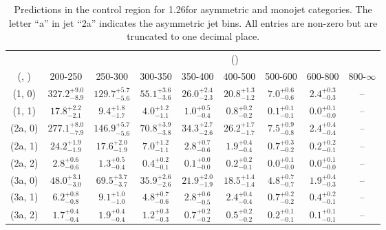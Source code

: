 \begin{table}[h!]
\tiny
\centering
\caption{Predictions in the \mmj control region for 1.26\ifb for asymmetric and monojet categories. The letter ``a'' in jet \eg ``2a''  indicates the asymmetric jet bins. All entries are non-zero but are truncated to one decimal place.\label{tab:predsep_ewk_mumu_asym}}
\begin{tabular}
{ccccccccc}
	\hline\hline
&	& \multicolumn{8}{c}{\scalht (\gev)} \\ 
	 (\njet,  \nb) & 200-250 & 250-300 & 300-350 & 350-400 & 400-500 & 500-600 & 600-800 & 800-$\infty$ \\ [0.8ex] 
\hline
	(1, 0) & $327.2^{+ 9.0 }_{- 8.9 }$ & $129.7^{+ 5.7 }_{- 5.6 }$ & $55.1^{+ 3.6 }_{- 3.6 }$ & $26.0^{+ 2.4 }_{- 2.3 }$ & $20.8^{+ 1.3 }_{- 1.2 }$ & $7.0^{+ 0.6 }_{- 0.6 }$ & $2.4^{+ 0.3 }_{- 0.3 }$ & -- \\[0.5ex] 
	(1, 1) & $17.8^{+ 2.2 }_{- 2.1 }$ & $9.4^{+ 1.8 }_{- 1.7 }$ & $4.0^{+ 1.2 }_{- 1.1 }$ & $1.0^{+ 0.5 }_{- 0.4 }$ & $0.8^{+ 0.2 }_{- 0.2 }$ & $0.1^{+ 0.1 }_{- 0.1 }$ & $0.0^{+ 0.1 }_{- 0.0 }$ & -- \\[0.5ex] 
	(2a, 0) & $277.1^{+ 8.0 }_{- 7.9 }$ & $146.9^{+ 5.7 }_{- 5.6 }$ & $70.8^{+ 3.9 }_{- 3.8 }$ & $34.3^{+ 2.7 }_{- 2.6 }$ & $26.2^{+ 1.7 }_{- 1.7 }$ & $7.5^{+ 0.9 }_{- 0.8 }$ & $2.4^{+ 0.4 }_{- 0.4 }$ & -- \\[0.5ex] 
	(2a, 1) & $24.2^{+ 1.9 }_{- 1.9 }$ & $17.6^{+ 2.0 }_{- 1.9 }$ & $7.0^{+ 1.2 }_{- 1.1 }$ & $2.8^{+ 0.7 }_{- 0.6 }$ & $1.9^{+ 0.4 }_{- 0.4 }$ & $0.7^{+ 0.3 }_{- 0.2 }$ & $0.2^{+ 0.2 }_{- 0.1 }$ & -- \\[0.5ex] 
	(2a, 2) & $2.8^{+ 0.6 }_{- 0.6 }$ & $1.3^{+ 0.5 }_{- 0.4 }$ & $0.4^{+ 0.2 }_{- 0.1 }$ & $0.1^{+ 0.0 }_{- 0.0 }$ & $0.2^{+ 0.2 }_{- 0.1 }$ & $0.0^{+ 0.1 }_{- 0.0 }$ & $0.0^{+ 0.1 }_{- 0.0 }$ & -- \\[0.5ex] 
	(3a, 0) & $48.0^{+ 3.1 }_{- 3.0 }$ & $69.5^{+ 3.7 }_{- 3.7 }$ & $35.9^{+ 2.6 }_{- 2.6 }$ & $21.9^{+ 2.0 }_{- 1.9 }$ & $18.5^{+ 1.4 }_{- 1.4 }$ & $4.8^{+ 0.7 }_{- 0.7 }$ & $1.9^{+ 0.4 }_{- 0.3 }$ & -- \\[0.5ex] 
	(3a, 1) & $6.2^{+ 0.8 }_{- 0.8 }$ & $9.1^{+ 1.0 }_{- 1.0 }$ & $4.8^{+ 0.7 }_{- 0.6 }$ & $2.8^{+ 0.6 }_{- 0.5 }$ & $2.4^{+ 0.4 }_{- 0.4 }$ & $0.7^{+ 0.2 }_{- 0.2 }$ & $0.4^{+ 0.2 }_{- 0.1 }$ & -- \\[0.5ex] 
	(3a, 2) & $1.7^{+ 0.4 }_{- 0.4 }$ & $1.9^{+ 0.4 }_{- 0.4 }$ & $1.2^{+ 0.3 }_{- 0.3 }$ & $0.7^{+ 0.2 }_{- 0.2 }$ & $0.5^{+ 0.2 }_{- 0.2 }$ & $0.2^{+ 0.1 }_{- 0.1 }$ & $0.1^{+ 0.1 }_{- 0.1 }$ & -- \\[0.5ex] 

\end{tabular}
\end{table}
